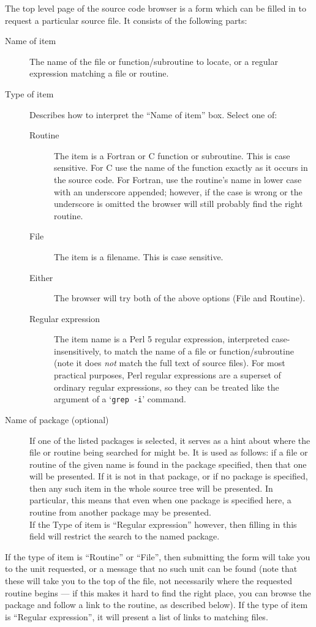 \documentclass[twoside,11pt]{article}
\renewcommand{\_}{\texttt{\symbol{95}}}
\begin{document}
The top level page of the source code browser is a form
which can be filled in to request a particular source file.
It consists of the following parts:
\begin{description}
\item[Name of item]
The name of the file or function/subroutine to locate, 
or a regular expression matching a file or routine.
\item[Type of item]
Describes how to interpret the ``Name of item'' box.  Select one of:
\begin{description}
   \item[Routine]
   The item is a Fortran or C function or subroutine.
   This is case sensitive.
   For C use the name of the function exactly as it occurs in the source code.
   For Fortran, use the routine's name in lower case with an 
   underscore appended;
   however, if the case is wrong or the underscore is omitted the 
   browser will still probably 
   find the right routine.
   \item[File]
   The item is a filename.  This is case sensitive.
   \item[Either]
   The browser will try both of the above options (File and Routine).
   \item[Regular expression]
   The item name is a Perl 5 regular expression, 
   interpreted case-insensitively,
   to match the name of a file or function/subroutine
   (note it does {\em not\/} match the full text of source files).
   For most practical purposes, Perl regular expressions are a superset
   of ordinary regular expressions, so they can be treated like the 
   argument of a `{\tt grep -i}' command.
\end{description}
\item[Name of package (optional)]
If one of the listed packages is selected, it serves
as a hint about where the file or routine being searched for might be.
It is used as follows: if a file or routine of the given name is found
in the package specified, then that one will be presented.
If it is not in that package, or if no package is specified, 
then any such item in the whole source tree will be presented.
In particular, this means that even when one package is specified here,
a routine from another package may be presented.\\
If the Type of item is ``Regular expression'' however, then filling in this
field will restrict the search to the named package.
\end{description}
If the type of item is ``Routine'' or ``File'', then submitting
the form will take you to the unit requested, or a message
that no such unit can be found
(note that these will take you to the top of the file,
not necessarily where the requested routine begins ---
if this makes it hard to find the right place, you can browse the
package and follow a link to the routine, as described below).
If the type of item is ``Regular expression'', 
it will present a list of links to
matching files.
\end{document}
